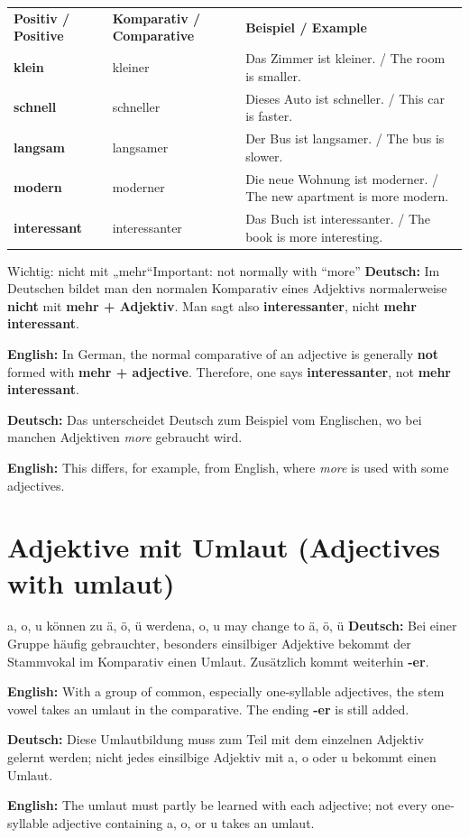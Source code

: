 \documentclass[a4paper,11pt]{article}
\newcommand{\GermanText}[1]{\textbf{Deutsch: }#1\par}
\newcommand{\EnglishText}[1]{{\small\color{SoftGray}\textbf{English: }#1\par}}
\begin{document}
      \begin{longtable}{>{\bfseries}p{3.7cm}|p{4.2cm}|p{5.5cm}}
         \rowcolor{HeaderBlueDark}
         \color{white}\textbf{Positiv / Positive} &
         \color{white}\textbf{Komparativ / Comparative} &
         \color{white}\textbf{Beispiel / Example} \\
         klein & kleiner & Das Zimmer ist kleiner. / The room is smaller. \\
         schnell & schneller & Dieses Auto ist schneller. / This car is faster. \\
         langsam & langsamer & Der Bus ist langsamer. / The bus is slower. \\
         modern & moderner & Die neue Wohnung ist moderner. / The new apartment is more modern. \\
         interessant & interessanter & Das Buch ist interessanter. / The book is more interesting. \\
      \end{longtable}

      \begin{grammarentry}{Wichtig: nicht mit „mehr“}{Important: not normally with “more”}
         \GermanText{Im Deutschen bildet man den normalen Komparativ eines Adjektivs normalerweise \textbf{nicht} mit \textbf{mehr + Adjektiv}. Man sagt also \textbf{interessanter}, nicht \textbf{mehr interessant}.}
         \EnglishText{In German, the normal comparative of an adjective is generally \textbf{not} formed with \textbf{mehr + adjective}. Therefore, one says \textbf{interessanter}, not \textbf{mehr interessant}.}

         \GermanText{Das unterscheidet Deutsch zum Beispiel vom Englischen, wo bei manchen Adjektiven \textit{more} gebraucht wird.}
         \EnglishText{This differs, for example, from English, where \textit{more} is used with some adjectives.}
      \end{grammarentry}

   \section{Adjektive mit Umlaut \textnormal{(Adjectives with umlaut)}}

      \begin{grammarentry}{a, o, u können zu ä, ö, ü werden}{a, o, u may change to ä, ö, ü}
         \GermanText{Bei einer Gruppe häufig gebrauchter, besonders einsilbiger Adjektive bekommt der Stammvokal im Komparativ einen Umlaut. Zusätzlich kommt weiterhin \textbf{-er}.}
         \EnglishText{With a group of common, especially one-syllable adjectives, the stem vowel takes an umlaut in the comparative. The ending \textbf{-er} is still added.}

         \GermanText{Diese Umlautbildung muss zum Teil mit dem einzelnen Adjektiv gelernt werden; nicht jedes einsilbige Adjektiv mit a, o oder u bekommt einen Umlaut.}
         \EnglishText{The umlaut must partly be learned with each adjective; not every one-syllable adjective containing a, o, or u takes an umlaut.}
      \end{grammarentry}
\end{document}

